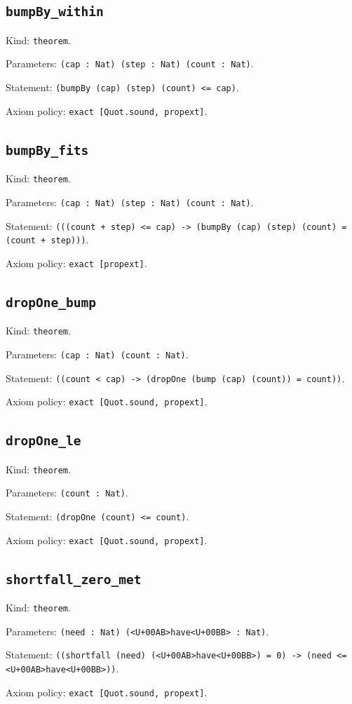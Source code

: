 \documentclass[11pt]{article}
\begin{document}
\subsection*{\texttt{bumpBy\_within}}
\noindent Kind: \texttt{theorem}.\par
\noindent Parameters: \texttt{(cap : Nat) (step : Nat) (count : Nat)}.\par
\noindent Statement: \texttt{(bumpBy (cap) (step) (count) <= cap)}.\par
\noindent Axiom policy: \texttt{exact [Quot.sound, propext]}.\par
\subsection*{\texttt{bumpBy\_fits}}
\noindent Kind: \texttt{theorem}.\par
\noindent Parameters: \texttt{(cap : Nat) (step : Nat) (count : Nat)}.\par
\noindent Statement: \texttt{(((count + step) <= cap) -> (bumpBy (cap) (step) (count) = (count + step)))}.\par
\noindent Axiom policy: \texttt{exact [propext]}.\par
\subsection*{\texttt{dropOne\_bump}}
\noindent Kind: \texttt{theorem}.\par
\noindent Parameters: \texttt{(cap : Nat) (count : Nat)}.\par
\noindent Statement: \texttt{((count < cap) -> (dropOne (bump (cap) (count)) = count))}.\par
\noindent Axiom policy: \texttt{exact [Quot.sound, propext]}.\par
\subsection*{\texttt{dropOne\_le}}
\noindent Kind: \texttt{theorem}.\par
\noindent Parameters: \texttt{(count : Nat)}.\par
\noindent Statement: \texttt{(dropOne (count) <= count)}.\par
\noindent Axiom policy: \texttt{exact [Quot.sound, propext]}.\par
\subsection*{\texttt{shortfall\_zero\_met}}
\noindent Kind: \texttt{theorem}.\par
\noindent Parameters: \texttt{(need : Nat) (<U+00AB>have<U+00BB> : Nat)}.\par
\noindent Statement: \texttt{((shortfall (need) (<U+00AB>have<U+00BB>) = 0) -> (need <= <U+00AB>have<U+00BB>))}.\par
\noindent Axiom policy: \texttt{exact [Quot.sound, propext]}.\par
\end{document}
